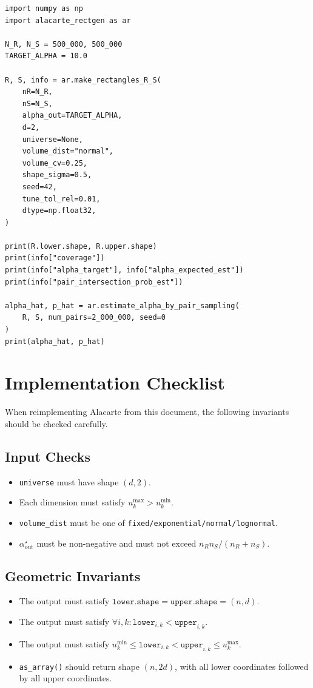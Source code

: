 \documentclass[11pt,a4paper]{article}
\newcommand{\code}[1]{\texttt{#1}}
\begin{document}
\begin{verbatim}
import numpy as np
import alacarte_rectgen as ar

N_R, N_S = 500_000, 500_000
TARGET_ALPHA = 10.0

R, S, info = ar.make_rectangles_R_S(
    nR=N_R,
    nS=N_S,
    alpha_out=TARGET_ALPHA,
    d=2,
    universe=None,
    volume_dist="normal",
    volume_cv=0.25,
    shape_sigma=0.5,
    seed=42,
    tune_tol_rel=0.01,
    dtype=np.float32,
)

print(R.lower.shape, R.upper.shape)
print(info["coverage"])
print(info["alpha_target"], info["alpha_expected_est"])
print(info["pair_intersection_prob_est"])

alpha_hat, p_hat = ar.estimate_alpha_by_pair_sampling(
    R, S, num_pairs=2_000_000, seed=0
)
print(alpha_hat, p_hat)
\end{verbatim}

\section{Implementation Checklist}

When reimplementing Alacarte from this document, the following invariants should be checked carefully.

\subsection{Input Checks}

\begin{itemize}
  \item \code{universe} must have shape $(d,2)$.
  \item Each dimension must satisfy $u_k^{\max}>u_k^{\min}$.
  \item \code{volume\_dist} must be one of \code{fixed/exponential/normal/lognormal}.
  \item $\alpha_{\mathrm{out}}^\star$ must be non-negative and must not exceed $n_Rn_S/(n_R+n_S)$.
\end{itemize}

\subsection{Geometric Invariants}

\begin{itemize}
  \item The output must satisfy $\code{lower}.\code{shape}=\code{upper}.\code{shape}=(n,d)$.
  \item The output must satisfy $\forall i,k:\code{lower}_{i,k}<\code{upper}_{i,k}$.
  \item The output must satisfy $u_k^{\min}\le\code{lower}_{i,k}<\code{upper}_{i,k}\le u_k^{\max}$.
  \item \code{as\_array()} should return shape $(n,2d)$, with all lower coordinates followed by all upper coordinates.
\end{itemize}
\end{document}
